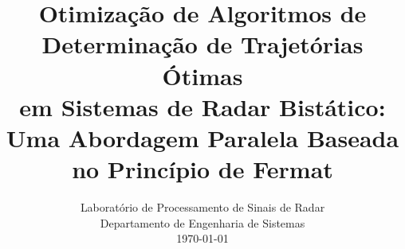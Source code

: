 \documentclass[12pt,a4paper]{article}
\begin{document}

\renewcommand{\arraystretch}{1.3}


\title{\textbf{Otimização de Algoritmos de Determinação de Trajetórias Ótimas \\
em Sistemas de Radar Bistático: \\
Uma Abordagem Paralela Baseada no Princípio de Fermat}}

\author{Laboratório de Processamento de Sinais de Radar\\
Departamento de Engenharia de Sistemas\\
\today}
\end{document}
